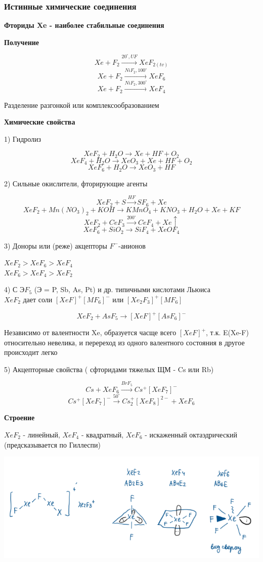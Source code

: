 \subsubsection*{Истинные химические соединения}

\textbf{Фториды Xe - наиболее стабильные соединения}

\textbf{Получение}

$$Xe + F_2 \xrightarrow{20^{\circ}, UF} XeF_{2(tv)}$$
$$Xe + F_2 \xrightarrow{NiF_2, 100^{\circ}} XeF_6$$
$$Xe + F_2 \xrightarrow{NiF_2, 300^{\circ}}XeF_4$$

Разделение разгонкой или комплексообразованием

\textbf{Химические свойства}

1) Гидролиз

$$XeF_2 + H_2O \rightarrow Xe + HF + O_2$$
$$XeF_4  + H_2O \rightarrow XeO_3 + Xe + HF + O_2$$
$$XeF_6 + H_2O \rightarrow XeO_3 + HF$$

2) Сильные окислители, фторирующие агенты

$$XeF_2 + S \xrightarrow{HF} SF_6 + Xe$$
$$XeF_2 + Mn(NO_3)_2 + KOH \rightarrow KMnO_4 + KNO_3 + H_2O + Xe + KF$$
$$XeF_2 + CeF_3 \xrightarrow{200^{\circ}} CeF_4 + Xe\uparrow$$
$$XeF_6 + SiO_2 \rightarrow SiF_4 + XeOF_4$$

3) Доноры или (реже) акцепторы $F^-$-анионов

$XeF_2> XeF_6 > XeF_4$\\
$XeF_6 > XeF_4 > XeF_2$

4) С Э$F_5$ (Э = P, Sb, As, Pt) и др. типичными кислотами Льюиса\\
$XeF_2$ дает соли $[XeF]^+[MF_6]^-$ или $[Xe_2F_3]^+[MF_6]$

$$XeF_2 + AsF_5 \rightarrow [XeF]^+[AsF_6]^-$$

Независимо от валентности Xe, образуется часще всего $[XeF]^+$, т.к. E(Xe-F) относительно невелика, и перереход из одного валентного состояния в другое происходит легко

5) Акцепторные свойства ( сфторидами тяжелых ЩМ - Cs или Rb)

$$Cs + XeF_6 \xrightarrow{BrF_5} Cs^+[XeF_7]^-$$
$$Cs^+[XeF_7]^- \xrightarrow{50^{\circ}} Cs_2^+[XeF_8]^{2-} + XeF_6$$

\textbf{Строение}

$XeF_2$ - линейный, $XeF_4$ - квадратный, $XeF_6$ - искаженный октаэдрический (предсказывается по Гиллеспи)

\includegraphics{images/13v2.png}


